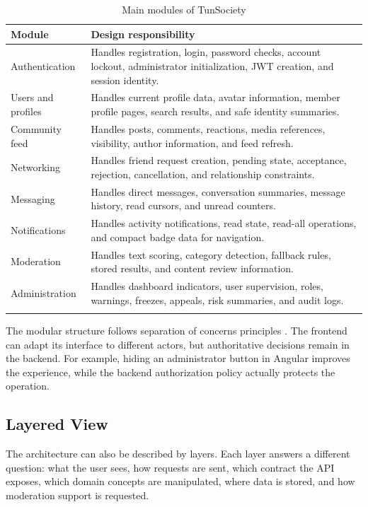 \begin{longtable}{|m{3.5cm}|m{10.4cm}|}
\hline
\textbf{Module} & \textbf{Design responsibility} \\
\hline
Authentication & Handles registration, login, password checks, account lockout, administrator initialization, JWT creation, and session identity. \\
\hline
Users and profiles & Handles current profile data, avatar information, member profile pages, search results, and safe identity summaries. \\
\hline
Community feed & Handles posts, comments, reactions, media references, visibility, author information, and feed refresh. \\
\hline
Networking & Handles friend request creation, pending state, acceptance, rejection, cancellation, and relationship constraints. \\
\hline
Messaging & Handles direct messages, conversation summaries, message history, read cursors, and unread counters. \\
\hline
Notifications & Handles activity notifications, read state, read-all operations, and compact badge data for navigation. \\
\hline
Moderation & Handles text scoring, category detection, fallback rules, stored results, and content review information. \\
\hline
Administration & Handles dashboard indicators, user supervision, roles, warnings, freezes, appeals, risk summaries, and audit logs. \\
\hline
\caption{Main modules of TunSociety}
\end{longtable}

The modular structure follows separation of concerns principles \cite{clean_architecture}. The frontend can adapt its interface to different actors, but authoritative decisions remain in the backend. For example, hiding an administrator button in Angular improves the experience, while the backend authorization policy actually protects the operation.

\subsection*{Layered View}

The architecture can also be described by layers. Each layer answers a different question: what the user sees, how requests are sent, which contract the API exposes, which domain concepts are manipulated, where data is stored, and how moderation support is requested.

